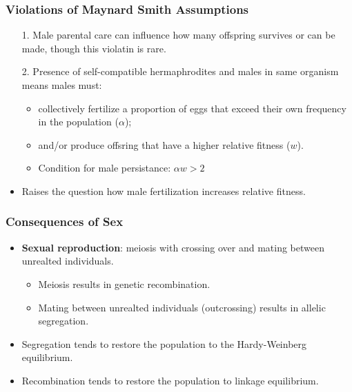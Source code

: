 \documentclass[12pt,a4paper]{article}
\begin{document}
\begin{itemize}
    \subsubsection{Violations of Maynard Smith Assumptions}
    \begin{itemize}
        \item[1.] Male parental care can influence how many offspring survives or can be made, though this violatin is rare.
        \item[2.] Presence of self-compatible hermaphrodites and males in same organism means males must:
            \begin{itemize}
                \item collectively fertilize a proportion of eggs that exceed their own frequency in the population ($\alpha$);
                \item and/or produce offsring that have a higher relative fitness (\(w\)).
                \item Condition for male persistance: \(\alpha w>2\)
            \end{itemize}
        \item Raises the question how male fertilization increases relative fitness.
    \end{itemize}
    \subsubsection{Consequences of Sex}
    \begin{itemize}
        \item \textbf{Sexual reproduction}: meiosis with crossing over and mating between unrealted individuals.
            \begin{itemize}
                \item Meiosis results in genetic recombination.
                \item Mating between unrealted individuals (outcrossing) results in allelic segregation.
            \end{itemize}
        \item {\color{o-Sun}Segregation} tends to restore the population to the {\color{o-Sun}Hardy-Weinberg equilibrium}.
        \item {\color{o-Sun}Recombination} tends to restore the population to {\color{o-Sun}linkage equilibrium}.
    \end{itemize}

\end{itemize}
\end{document}
